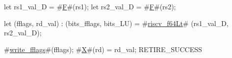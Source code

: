let rs1_val_D = #\hyperref[sailRISCVzF]{F}#(rs1);
let rs2_val_D = #\hyperref[sailRISCVzF]{F}#(rs2);

let (fflags, rd_val) : (bits_fflags, bits_LU) =
    #\hyperref[sailRISCVzriscvzyf64Lt]{riscv\_f64Lt}# (rs1_val_D, rs2_val_D);

#\hyperref[sailRISCVzwritezyfflags]{write\_fflags}#(fflags);
#\hyperref[sailRISCVzX]{X}#(rd) = rd_val;
RETIRE_SUCCESS

